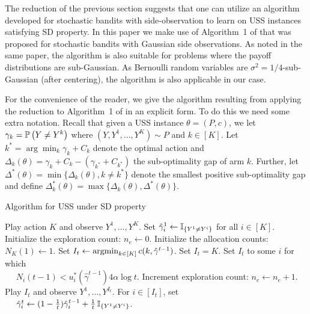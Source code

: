 \newcommand{\set}{\leftarrow}
\newcommand{\hgamma}{\hat{\gamma}}
The reduction of the previous section suggests that one can  utilize 
an algorithm developed for stochastic bandits with side-observation to learn on USS instances satisfying SD property.
In this paper we make use of Algorithm~1 of \cite{WGySz:NIPS15}
that was proposed for stochastic bandits with Gaussian side observations. 
As noted in the same paper, the algorithm is also suitable for problems where the payoff distributions are sub-Gaussian.
As Bernoulli random variables are $\sigma^2=1/4$-sub-Gaussian (after centering),
the algorithm is also applicable in our case.

For the convenience of the reader, we give the algorithm resulting from applying the reduction to Algorithm~1 
of \cite{WGySz:NIPS15} in an explicit form.
To do this we need some extra notation.
Recall that given a USS instance $\theta = (P,c)$, we let $\gamma_k = \mathbb{P}\left(Y\ne Y^k\right)$ where $(Y,Y^1,\dots,Y^K)\sim P$ and $k\in [K]$. Let $k^*=\arg\min_k \gamma_k +C_k$ denote the optimal action and $\Delta_k(\theta)=\gamma_k+C_k-(\gamma_{k^*}+C_{k^*})$ the sub-optimality gap of arm $k$. Further, let $\Delta^*(\theta) = \min\{\Delta_k(\theta), k\neq k^* \}$ denote the smallest positive sub-optimality gap and define $\Delta_k^*(\theta) =\max\{\Delta_k(\theta), \Delta^*(\theta)\}$.

\vspace{-.5cm}
\begin{center}
	\begin{minipage}{0.48\textwidth}
		\begin{algorithm}[H]
			\caption{Algorithm for USS under SD property} 
			\label{alg:asym}
			\begin{algorithmic}[1]
				\STATE Play action $K$ and observe  $Y^1,\dots,Y^K$.
				\STATE Set $\hgamma_{i}^1 \set \one{Y^1\ne Y^i}$ for all $i\in [K]$.
				\STATE Initialize the exploration count: $n_e \set 0$.
				\STATE Initialize the allocation counts: $N_K(1) \set 1$.
				\IF{$\frac{N(t-1)}{4\alpha \log t}\in C(\hgamma^{t-1})$} \label{alg:check}
				\STATE Set $I_t \set \argmin_{k\in [K]} c(k,\hgamma^{t-1})$. \label{alg:greedy}
				\ELSE
				 \label{alg:starve}
				\STATE Set $I_t =K$. \label{alg:forced}
				\ELSE
				\STATE Set $I_t$ to some $i$ for which \label{alg:plan} \\
				$\quad$ $N_i(t-1)< u_i^*(\hgamma^{t-1})4\alpha\log t$.
				\ENDIF
				\STATE Increment exploration count: $n_e \set n_e+1$.
				\ENDIF
				\STATE Play $I_t$ and observe  $Y^1,\dots,Y^{I_t}$.
				\STATE For $i\in [I_t]$, set\\
				$\quad$ $\hgamma_i^t \set (1-{1\over t}) \hgamma_i^{t-1} + {1\over t} \,\one{Y^1\ne Y^i}$.
				\ENDFOR
			\end{algorithmic}
		\end{algorithm}
	\end{minipage}
\end{center}

